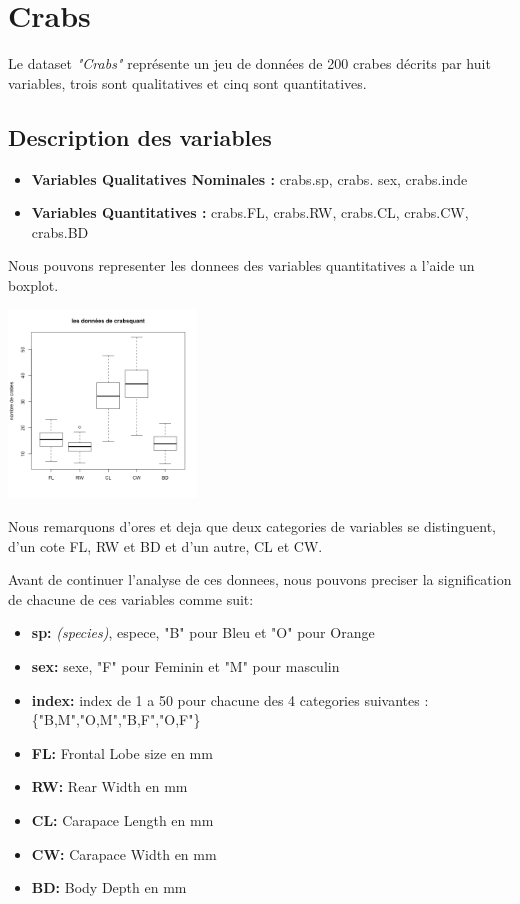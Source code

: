 \documentclass[]{report}
\begin{document}
\section{Crabs}
Le dataset \textit{"Crabs"} représente un jeu de données de 200 crabes décrits par huit variables, trois sont qualitatives et cinq sont quantitatives.

\subsection{Description des variables}


\begin{itemize}
	\item \textbf{Variables Qualitatives Nominales :}  crabs.sp, crabs. sex, crabs.inde
	\item \textbf{Variables Quantitatives : } crabs.FL, crabs.RW, crabs.CL, crabs.CW, crabs.BD
\end{itemize}

Nous pouvons representer les donnees des variables quantitatives a l'aide un boxplot.
\begin{center}
	\includegraphics[width=50mm]{Figures/Crabs/bxp_crabsquant.png}
	\label{fig:boxplot_crabs_quantitatives}
\end{center}

Nous remarquons d'ores et deja que deux categories de variables se distinguent, d'un cote FL, RW et BD et d'un autre, CL et CW.

Avant de continuer l'analyse de ces donnees, nous pouvons preciser la signification de chacune de ces variables comme suit:
\begin{itemize}
	\item \textbf{sp:} \textit{(species)}, espece, "B" pour Bleu et "O" pour Orange
	\item \textbf{sex:} sexe, "F" pour Feminin et "M" pour masculin
	\item \textbf{index:} index de 1 a 50 pour chacune des 4 categories suivantes : \{"B,M","O,M","B,F","O,F"\}
	\item \textbf{FL:} Frontal Lobe size en mm
	\item \textbf{RW:} Rear Width en mm
	\item \textbf{CL:} Carapace Length en mm
	\item \textbf{CW:} Carapace Width en mm 
	\item \textbf{BD:} Body Depth en mm
\end{itemize}
\end{document}
